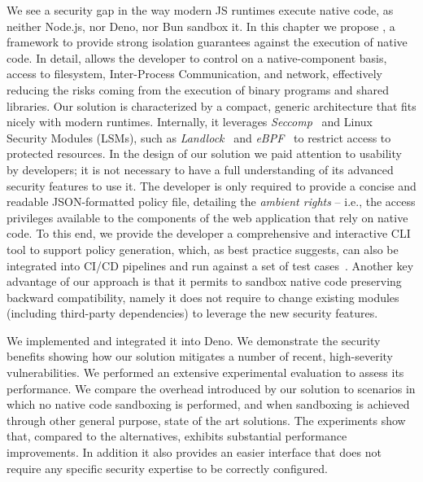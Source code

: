 We see a security gap in the way modern JS runtimes execute native
code, as neither Node.js, nor Deno, nor Bun sandbox it.  In this chapter
we propose \natisand, a framework to provide strong isolation guarantees
against the execution of native code. In detail, \natisand allows the
developer to control on a native-component basis, access to filesystem, Inter-Process
Communication, and network, effectively reducing the risks coming from
the execution of binary programs and shared libraries. Our solution is
characterized by a compact, generic architecture that fits nicely with
modern runtimes. Internally, it leverages {\em
  Seccomp}~\cite{seccompbpf} and Linux Security Modules (LSMs), such
as {\em Landlock}~\cite{landlock} and {\em eBPF}~\cite{corbet2014eBPF}
to restrict access to protected resources. In the design of our
solution we paid attention to usability by developers; it is not
necessary to have a full understanding of its advanced security
features to use it.  The developer is only required to provide a
concise and readable JSON-formatted policy file, detailing the {\em
  ambient rights} -- i.e., the access privileges available to the
components of the web application that rely on native code. To this
end, we provide the developer a comprehensive and interactive CLI tool
to support policy generation, which, as best practice
suggests, can also be integrated into CI/CD pipelines and run against
a set of test cases~\cite{sandtrap,slimtoolkit}. Another key advantage
of our approach is that it permits to sandbox native code preserving
backward compatibility, namely it does not require to change existing
modules (including third-party dependencies) to leverage the new
security features.

We implemented \natisand and integrated it into Deno. We demonstrate the
security benefits showing how our solution mitigates a number of
recent, high-severity vulnerabilities. We performed an extensive
experimental evaluation to assess its performance. We compare the
overhead introduced by our solution to scenarios in which no native
code sandboxing is performed, and when sandboxing is achieved through
other general purpose, state of the art solutions. The experiments
show that, compared to the alternatives, \natisand exhibits substantial
performance improvements. In addition it also provides an easier
interface that does not require any specific security expertise to be
correctly configured.


